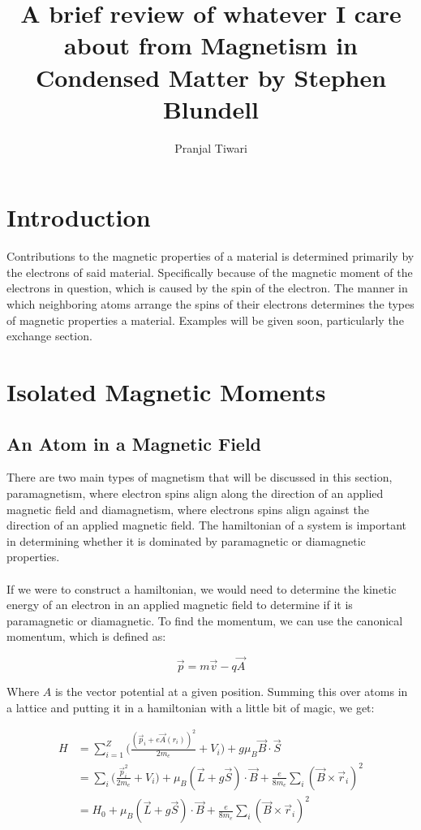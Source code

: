 \documentclass[11pt,onecolumn]{article}
\title{A brief review of whatever I care about from Magnetism in Condensed Matter by Stephen Blundell}
\author{Pranjal Tiwari}
\begin{document}
\maketitle
\section{Introduction}

Contributions to the magnetic properties of a material is determined primarily by the electrons of said material. Specifically because of the magnetic moment of the electrons in question, which is caused by the spin of the electron. The manner in which neighboring atoms arrange the spins of their electrons determines the types of magnetic properties a material. Examples will be given soon, particularly the exchange section.

\section{Isolated Magnetic Moments}

\subsection{An Atom in a Magnetic Field}

There are two main types of magnetism that will be discussed in this section, paramagnetism, where electron spins align along the direction of an applied magnetic field and diamagnetism, where electrons spins align against the direction of an applied magnetic field. The hamiltonian of a system is important in determining whether it is dominated by paramagnetic or diamagnetic properties.\\
\\
If we were to construct a hamiltonian, we would need to determine the kinetic energy of an electron in an applied magnetic field to determine if it is paramagnetic or diamagnetic. To find the momentum, we can use the canonical momentum, which is defined as:

\begin{equation*}
\vec{p}=m\vec{v}-q\vec{A}
\end{equation*}

Where $A$ is the vector potential at a given position. Summing this over atoms in a lattice and putting it in a hamiltonian with a little bit of magic, we get:

\begin{align*}
H &= \sum_{i=1}^{Z}\bigg(\frac{(\vec{p}_i+e\vec{A}(r_i))^2}{2m_e}+V_i\bigg)+g\mu_B\vec{B}\cdot\vec{S}\\
&= \sum_{i} \bigg(\frac{\vec{p}_i^2}{2m_e}+V_i\bigg)+\mu_B(\vec{L}+g\vec{S})\cdot\vec{B}+\frac{e}{8m_e}\sum_{i}(\vec{B}\times\vec{r}_i)^2\\
&= H_0+\mu_B(\vec{L}+g\vec{S})\cdot\vec{B}+\frac{e}{8m_e}\sum_{i}(\vec{B}\times\vec{r}_i)^2\\
\end{align*}
\end{document}
